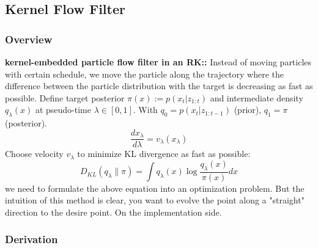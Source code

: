 \documentclass{article}
\begin{document}



\clearpage
\subsection{Kernel Flow Filter}

\subsubsection{Overview}
\textbf{kernel-embedded particle flow filter in an RK:\cite{Pulido2019,HuVanLeeuwen2021}:} Instead of moving particles with certain schedule, we move the particle along the trajectory where the difference between the particle distribution with the target is decreasing as fast as possible. 
Define target posterior $\pi(x) := p(x_t | z_{1:t})$ and intermediate density $q_\lambda(x)$ at pseudo-time $\lambda \in [0,1]$. With $q_0 = p(x_t | z_{1:t-1})$ (prior), $q_1 = \pi$ (posterior).
\begin{equation}
\frac{dx_\lambda}{d\lambda} = v_\lambda(x_\lambda)
\end{equation}
Choose velocity $v_\lambda$ to minimize KL divergence as fast as possible:
\begin{equation}
D_{KL}(q_\lambda \| \pi) = \int q_\lambda(x) \log \frac{q_\lambda(x)}{\pi(x)} dx
\end{equation}
we need to formulate the above equation into an optimization problem. But the intuition of this method is clear, you want to evolve the point along a "straight" direction to the desire point. On the implementation side. 

  



\subsubsection{Derivation}
\end{document}
